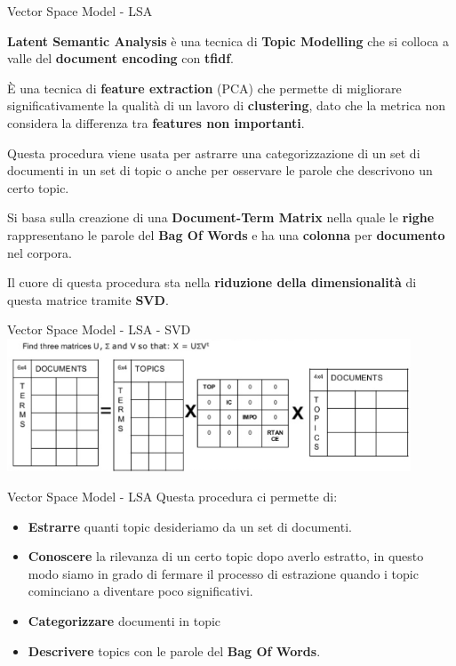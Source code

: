 \documentclass[british]{beamer}
\begin{document}
\begin{frame}{Vector Space Model - LSA}
	
	\textbf{Latent Semantic Analysis} \`{e} una tecnica di \textbf{Topic Modelling} che si colloca a valle del \textbf{document encoding} con \textbf{tfidf}. 
	
	\`{E} una tecnica di \textbf{feature extraction} (PCA) che permette di migliorare significativamente la qualit\`{a} di un lavoro di \textbf{clustering}, dato che la metrica non considera la differenza tra \textbf{features non importanti}.
	
	Questa procedura viene usata per astrarre una categorizzazione di un \alert{set di documenti} in un \alert{set di topic} o anche per osservare le parole che descrivono un certo topic.
	
	Si basa sulla creazione di una \textbf{Document-Term Matrix} nella quale le \textbf{righe} rappresentano le parole del \textbf{Bag Of Words} e ha una \textbf{colonna} per \textbf{documento} nel corpora.
	
	Il cuore di questa procedura sta nella \textbf{riduzione della dimensionalit\`{a}} di questa matrice tramite \textbf{SVD}.
	
\end{frame}

\begin{frame}{Vector Space Model - LSA - SVD}
	\includegraphics[width=0.9\textwidth, height=0.4\textheight]{./Imgs/LSA1}
\end{frame}

\begin{frame}{Vector Space Model - LSA}
	Questa procedura ci permette di:
	\begin{itemize}
		\item \textbf{Estrarre} quanti topic desideriamo da un set di documenti.
		\item \textbf{Conoscere} la rilevanza di un certo topic dopo averlo estratto, in questo modo siamo in grado di fermare il processo di estrazione quando i topic cominciano a diventare poco significativi.
		\item \textbf{Categorizzare} documenti in topic
		\item \textbf{Descrivere} topics con le parole del \textbf{Bag Of Words}.
	\end{itemize}
\end{frame}
\end{document}

